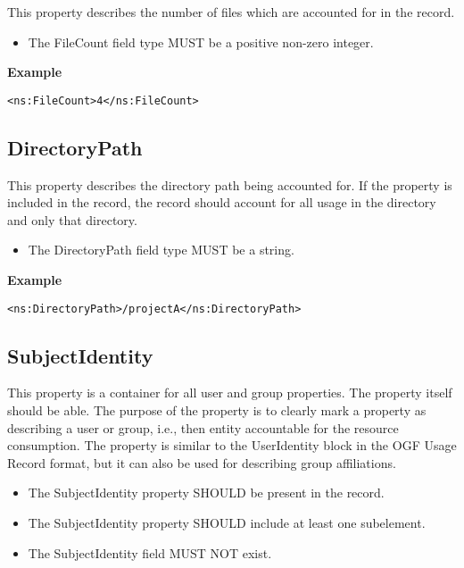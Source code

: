 This property describes the number of files which are accounted for in the
record.

\begin{itemize}
\item The FileCount field type MUST be a positive non-zero integer.
\end{itemize}

{\bf Example}
\begin{verbatim}
<ns:FileCount>4</ns:FileCount>
\end{verbatim}



\subsection{DirectoryPath}

This property describes the directory path being accounted for. If the property
is included in the record, the record should account for all usage in the
directory and only that directory.


\begin{itemize}
\item The DirectoryPath field type MUST be a string.
\end{itemize}

{\bf Example}
\begin{verbatim}
<ns:DirectoryPath>/projectA</ns:DirectoryPath>
\end{verbatim}



\subsection{SubjectIdentity}

This property is a container for all user and group properties. The property
itself should be able. The purpose of the property is to clearly mark a
property as describing a user or group, i.e., then entity accountable for the
resource consumption. The property is similar to the UserIdentity block in the
OGF Usage Record format, but it can also be used for describing group
affiliations.

\begin{itemize}
\item The SubjectIdentity property SHOULD be present in the record.
\item The SubjectIdentity property SHOULD include at least one subelement.
\item The SubjectIdentity field MUST NOT exist.
\end{itemize}

